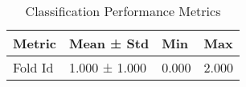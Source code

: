 
\begin{table}[htbp]
\centering
\caption{Classification Performance Metrics}
\label{tab:classification_results}
\begin{tabular}{llll}
\toprule
Metric & Mean ± Std & Min & Max \\
\midrule
Fold Id & 1.000 ± 1.000 & 0.000 & 2.000 \\
\bottomrule
\end{tabular}
\end{table}
